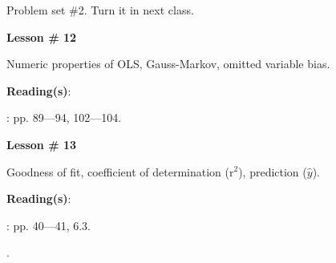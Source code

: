 \documentclass[letterpaper]{article}
\renewenvironment{itemize}{
  \begin{list}{}{
    \setlength{\leftmargin}{1.5em}
  }
}{
  \end{list}
}
\begin{document}
\begin{enumerate}

\item[{\color{red}\Pointinghand}] Problem set \#2. Turn it in next class.


			\begin{itemize} 
				\item[$\bullet$] {\bf Lesson \# 12} %
					\begin{itemize} 
						\item[$\circ$] Numeric properties of OLS, Gauss-Markov, omitted variable bias. %
						\item[$\circ$] {\bf Reading(s)}: 
							\begin{itemize} 
								\item[$\diamond$] \textcite{Wooldridge2002}: pp. 89---94, 102---104.
							\end{itemize}
					\end{itemize}
			\end{itemize}



			\begin{itemize} 
				\item[$\bullet$] {\bf Lesson \# 13} %
					\begin{itemize} 
						\item[$\circ$] Goodness of fit, coefficient of determination (r$^2$), prediction ($\hat y$). 
						\item[$\circ$] {\bf Reading(s)}:
							\begin{itemize} 
								\item[$\diamond$] \textcite{Wooldridge2002}: pp. 40---41, 6.3.
								\item[$\diamond$] .


\end{itemize}
\end{itemize}
\end{itemize}
\end{enumerate}
\end{document}

